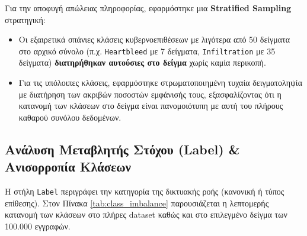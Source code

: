 \documentclass[11pt,a4paper]{article}
\newcommand{\eng}[1]{\textlatin{#1}}
\begin{document}
Για την αποφυγή απώλειας πληροφορίας, εφαρμόστηκε μια \textbf{\eng{Stratified Sampling}} στρατηγική:
\begin{itemize}
    \item Οι εξαιρετικά σπάνιες κλάσεις κυβερνοεπιθέσεων με λιγότερα από 50 δείγματα στο αρχικό σύνολο (π.χ. \texttt{\eng{Heartbleed}} με 7 δείγματα, \texttt{\eng{Infiltration}} με 35 δείγματα) \textbf{διατηρήθηκαν αυτούσιες στο δείγμα} χωρίς καμία περικοπή.
    \item Για τις υπόλοιπες κλάσεις, εφαρμόστηκε στρωματοποιημένη τυχαία δειγματοληψία με διατήρηση των ακριβών ποσοστών εμφάνισής τους, εξασφαλίζοντας ότι η κατανομή των κλάσεων στο δείγμα είναι πανομοιότυπη με αυτή του πλήρους καθαρού συνόλου δεδομένων.
\end{itemize}

\newpage

\subsection{Ανάλυση Μεταβλητής Στόχου (\eng{Label}) \& Ανισορροπία Κλάσεων}
Η στήλη \texttt{\eng{Label}} περιγράφει την κατηγορία της δικτυακής ροής (κανονική ή τύπος επίθεσης). Στον Πίνακα \ref{tab:class_imbalance} παρουσιάζεται η λεπτομερής κατανομή των κλάσεων στο πλήρες \eng{dataset} καθώς και στο επιλεγμένο δείγμα των 100.000 εγγραφών.
\end{document}

